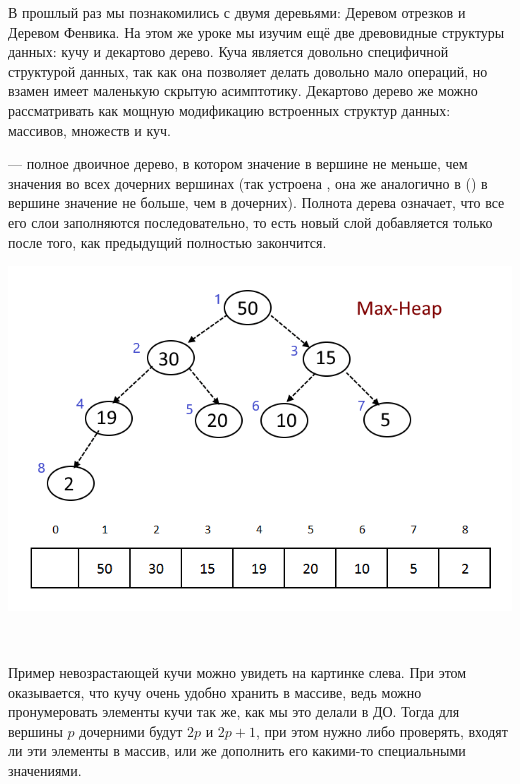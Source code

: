 В прошлый раз мы познакомились с двумя деревьями: Деревом отрезков и Деревом Фенвика. На этом же уроке мы изучим ещё две древовидные структуры данных: кучу и декартово дерево. Куча является довольно специфичной структурой данных, так как она позволяет делать довольно мало операций, но взамен имеет маленькую скрытую асимптотику. Декартово дерево же можно рассматривать как мощную модификацию встроенных структур данных: массивов, множеств и куч.


 — полное двоичное дерево, в котором значение в вершине не меньше, чем значения во всех дочерних вершинах (так устроена , она же  аналогично в  () в вершине значение не больше, чем в дочерних). Полнота дерева означает, что все его слои заполняются последовательно, то есть новый слой добавляется только после того, как предыдущий полностью закончится.

\begin{minipage}[c]{0.55\linewidth}
    \includegraphics[scale=0.55]{img/max_heap.png}
\end{minipage}
\begin{minipage}[c]{0.03\linewidth}\ \end{minipage}
\begin{minipage}[c]{0.34\linewidth}
    Пример невозрастающей кучи можно увидеть на картинке слева. При этом оказывается, что кучу очень удобно хранить в массиве, ведь можно пронумеровать элементы кучи так же, как мы это делали в ДО. Тогда для вершины $p$ дочерними будут $2p$ и $2p + 1$, при этом нужно либо проверять, входят ли эти элементы в массив, или же дополнить его какими-то специальными значениями.
\end{minipage}

